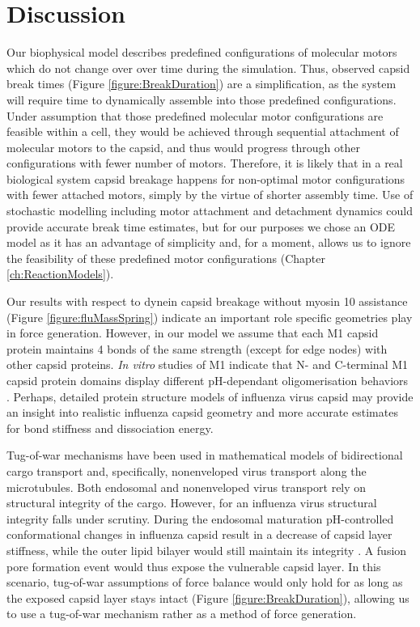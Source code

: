 \section{Discussion}

Our biophysical model describes predefined configurations of molecular motors which do not change over over time during the simulation. Thus, observed capsid break times (Figure \ref{figure:BreakDuration}) are a simplification, as the system will require time to dynamically assemble into those predefined configurations. Under assumption that those predefined molecular motor configurations are feasible within a cell, they would be achieved through sequential attachment of molecular motors to the capsid, and thus would progress through other configurations with fewer number of motors. Therefore, it is likely that in a real biological system capsid breakage happens for non-optimal motor configurations with fewer attached motors, simply by the virtue of shorter assembly time. Use of stochastic modelling including motor attachment and detachment dynamics could provide accurate break time estimates, but for our purposes we chose an ODE model as it has an advantage of simplicity and, for a moment, allows us to ignore the feasibility of these predefined motor configurations (Chapter \ref{ch:ReactionModels}).

Our results with respect to dynein capsid breakage without myosin 10 assistance (Figure \ref{figure:fluMassSpring}) indicate an important role specific geometries play in force generation. However, in our model we assume that each M1 capsid protein maintains 4 bonds of the same strength (except for edge nodes) with other capsid proteins. \textit{In vitro} studies of M1 indicate that N- and C-terminal M1 capsid protein domains display different pH-dependant oligomerisation behaviors \cite{zhang2012dissection}. Perhaps, detailed protein structure models of influenza virus capsid may provide an insight into realistic influenza capsid geometry and more accurate estimates for bond stiffness and dissociation energy.

Tug-of-war mechanisms \cite{hancock2014bidirectional} have been used in mathematical models of bidirectional cargo transport \cite{muller2008tug} and, specifically, nonenveloped virus transport \cite{gazzola2009stochastic} along the microtubules. Both endosomal and nonenveloped virus transport rely on structural integrity of the cargo. However, for an influenza virus structural integrity falls under scrutiny. During the endosomal maturation pH-controlled conformational changes in influenza capsid result in a decrease of capsid layer stiffness, while the outer lipid bilayer would still maintain its integrity \cite{li2014ph}. A fusion pore formation event would thus expose the vulnerable capsid layer. In this scenario, tug-of-war assumptions of force balance would only hold for as long as the exposed capsid layer stays intact (Figure \ref{figure:BreakDuration}), allowing us to use a tug-of-war mechanism rather as a method of force generation.

